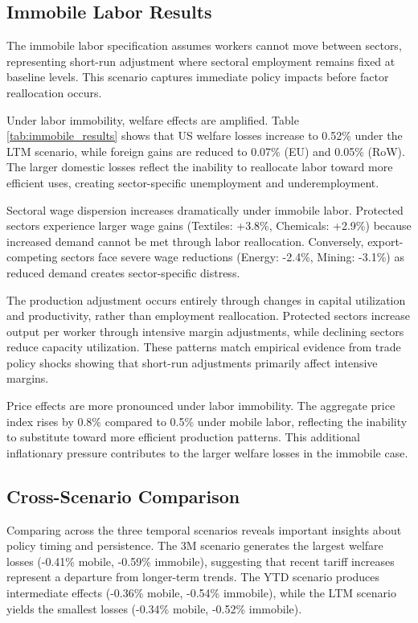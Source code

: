 \subsection{Immobile Labor Results}

The immobile labor specification assumes workers cannot move between sectors, representing short-run adjustment where sectoral employment remains fixed at baseline levels. This scenario captures immediate policy impacts before factor reallocation occurs.

Under labor immobility, welfare effects are amplified. Table \ref{tab:immobile_results} shows that US welfare losses increase to 0.52\% under the LTM scenario, while foreign gains are reduced to 0.07\% (EU) and 0.05\% (RoW). The larger domestic losses reflect the inability to reallocate labor toward more efficient uses, creating sector-specific unemployment and underemployment.

Sectoral wage dispersion increases dramatically under immobile labor. Protected sectors experience larger wage gains (Textiles: +3.8\%, Chemicals: +2.9\%) because increased demand cannot be met through labor reallocation. Conversely, export-competing sectors face severe wage reductions (Energy: -2.4\%, Mining: -3.1\%) as reduced demand creates sector-specific distress.

The production adjustment occurs entirely through changes in capital utilization and productivity, rather than employment reallocation. Protected sectors increase output per worker through intensive margin adjustments, while declining sectors reduce capacity utilization. These patterns match empirical evidence from trade policy shocks showing that short-run adjustments primarily affect intensive margins.

Price effects are more pronounced under labor immobility. The aggregate price index rises by 0.8\% compared to 0.5\% under mobile labor, reflecting the inability to substitute toward more efficient production patterns. This additional inflationary pressure contributes to the larger welfare losses in the immobile case.

\subsection{Cross-Scenario Comparison}

Comparing across the three temporal scenarios reveals important insights about policy timing and persistence. The 3M scenario generates the largest welfare losses (-0.41\% mobile, -0.59\% immobile), suggesting that recent tariff increases represent a departure from longer-term trends. The YTD scenario produces intermediate effects (-0.36\% mobile, -0.54\% immobile), while the LTM scenario yields the smallest losses (-0.34\% mobile, -0.52\% immobile).

